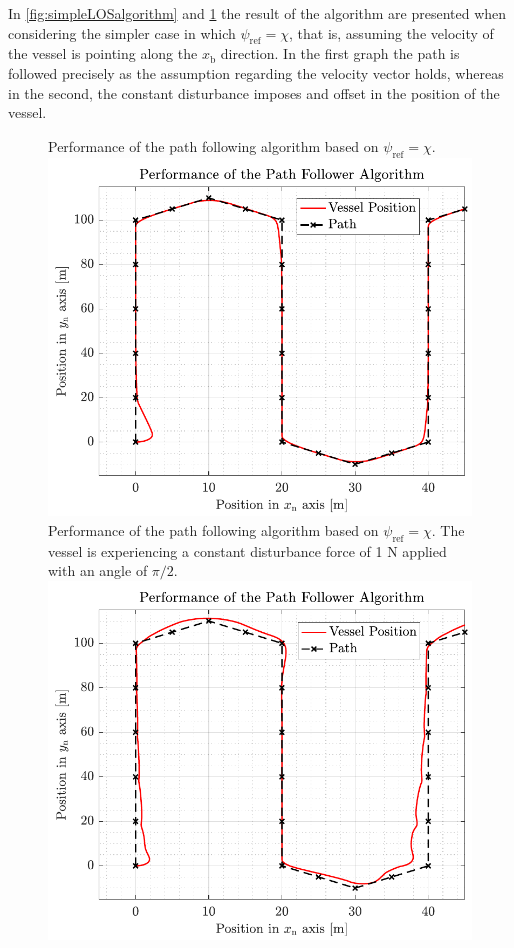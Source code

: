 In \autoref{fig:simpleLOSalgorithm} and \ref{fig:simpleLOSalgorithmdisturbance} the result of the algorithm are presented when considering the simpler case in which $\psi_\mathrm{ref} = \chi$, that is, assuming the velocity of the vessel is pointing along the $x_\mathrm{b}$ direction. In the first graph the path is followed precisely as the assumption regarding the velocity vector holds,  whereas in the second, the constant disturbance imposes and offset in the position of the vessel.
\begin{figure}[H]
	\captionbox  %
	{               %
	 	Performance of the path following algorithm based on $\psi_\mathrm{ref}=\chi$.                %
		\label{fig:simpleLOSalgorithm}                                  %
	}                                                                 %
	{                                                                  %
		\includegraphics[width=.45\textwidth]{figures/pathfollowingsimple}         %
	}                                                                    %
	\hspace{5pt}                                                          %
	\captionbox  %
	{       
		Performance of the path following algorithm based on $\psi_\mathrm{ref}=\chi$. The vessel is experiencing a constant disturbance force of 1 N applied with an angle of $\pi/2$.                                                                  %
		\label{fig:simpleLOSalgorithmdisturbance}                                     %
	}                                                                           %
	{                                                                            %
		\includegraphics[width=.45\textwidth]{figures/pathfollowingsimpledist}            %
	}                                                                             %
\end{figure}
